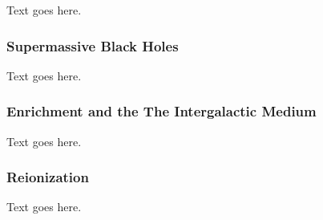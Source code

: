 Text goes here.



\subsubsection{Supermassive Black Holes}
\label{subsubsec:early_universe--baryonic_processes--smbhs}


Text goes here.



\subsubsection{Enrichment and the The Intergalactic Medium}
\label{subsubsec:early_universe--baryonic_processes--igm}


Text goes here.



\subsubsection{Reionization}
\label{subsubsec:early_universe--baryonic_processes--reionization}


Text goes here.




